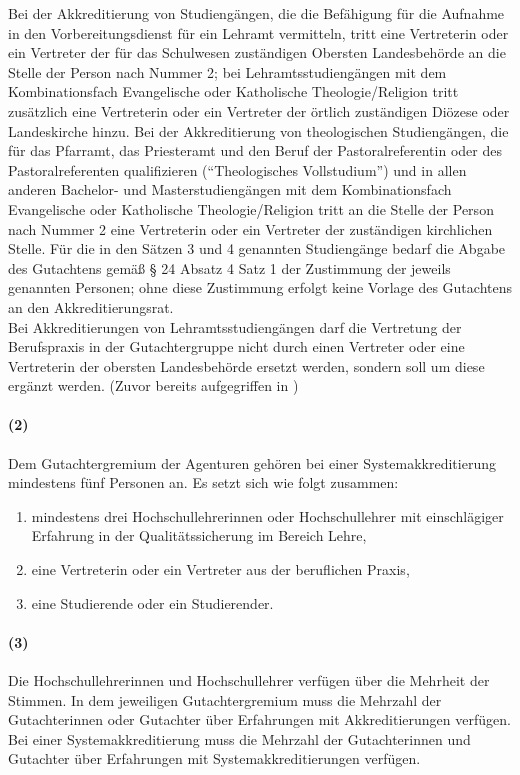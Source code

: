 \documentclass[a4paper]{scrartcl}
\begin{document}
Bei der Akkreditierung von Studiengängen, die die Befähigung für die
Aufnahme in den Vorbereitungsdienst für ein Lehramt vermitteln, tritt eine Vertreterin oder ein Vertreter der für das Schulwesen zuständigen Obersten Landesbehörde an die Stelle der Person nach Nummer 2; bei Lehramtsstudiengängen mit dem Kombinationsfach Evangelische oder Katholische Theologie/Religion tritt zusätzlich eine Vertreterin oder ein Vertreter der örtlich zuständigen Diözese oder Landeskirche hinzu. Bei der Akkreditierung von theologischen Studiengängen, die für das Pfarramt, das Priesteramt und den Beruf der Pastoralreferentin oder des Pastoralreferenten qualifizieren (\enquote{Theologisches Vollstudium}) und in allen anderen Bachelor- und Masterstudiengängen mit dem Kombinationsfach Evangelische oder Katholische Theologie/Religion tritt an die Stelle der Person nach Nummer 2 eine Vertreterin oder ein Vertreter der zuständigen kirchlichen Stelle. Für die in den Sätzen 3 und 4 genannten Studiengänge bedarf die Abgabe des Gutachtens gemäß § 24 Absatz 4 Satz 1 der Zustimmung der jeweils genannten Personen; ohne diese Zustimmung erfolgt keine Vorlage des Gutachtens an den Akkreditierungsrat.\\

\textcolor{Bernd}{\textbf{\cite{RESO: SoSe2018-RV}} Bei Akkreditierungen von Lehramtsstudiengängen darf die Vertretung der Berufspraxis in der Gutachtergruppe nicht durch einen Vertreter oder eine Vertreterin der obersten Landesbehörde ersetzt werden, sondern soll um diese ergänzt werden. (Zuvor bereits aufgegriffen in \textbf{\cite{POS: WiSe2017-AkkRL}})}

\paragraph{(2)} Dem Gutachtergremium der Agenturen gehören bei einer Systemakkreditierung mindestens fünf Personen an. Es setzt sich wie folgt zusammen:
\begin{enumerate}
\item mindestens drei Hochschullehrerinnen oder Hochschullehrer mit
einschlägiger Erfahrung in der Qualitätssicherung im Bereich Lehre,
\item eine Vertreterin oder ein Vertreter aus der beruflichen Praxis,
\item eine Studierende oder ein Studierender.
\end{enumerate}
\paragraph{(3)} Die Hochschullehrerinnen und Hochschullehrer verfügen über die Mehrheit der Stimmen. In dem jeweiligen Gutachtergremium muss die Mehrzahl der Gutachterinnen oder Gutachter über Erfahrungen mit Akkreditierungen verfügen. Bei einer Systemakkreditierung muss die Mehrzahl der Gutachterinnen und Gutachter über Erfahrungen mit Systemakkreditierungen verfügen.\\
\end{document}
